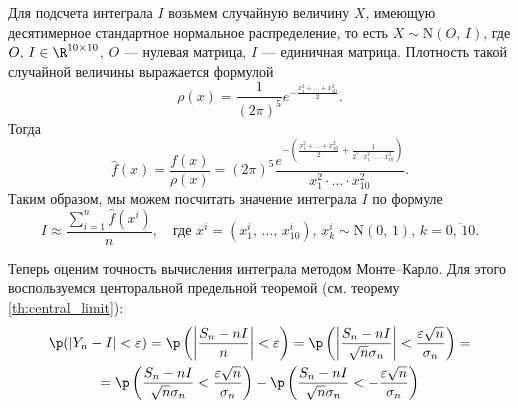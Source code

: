 Для подсчета интеграла $I$ возьмем случайную величину $X$, имеющую десятимерное стандартное нормальное распределение, то есть $X \sim \mbox{N} (O,\,I)$, где $O,\,I \in \R^{10 \times 10}$, $O$ --- нулевая матрица, $I$ --- единичная матрица. Плотность такой случайной величины выражается формулой
$$
        \rho(x)
        =
        \frac{1}{(2\pi)^5}
        e^{-\frac{x_1^2 + \ldots + x_{10}^2}{2}}.
$$
Тогда
$$
\boxed{
        \hat f(x) = \frac{f(x)}{\rho(x)}
        =
        (2\pi)^5
        \frac
        {
                e^{-\left(\frac{x_1^2 + \ldots + x_{10}^2}{2} + \frac{1}{2^7 \cdot x_1^2 \cdot \ldots \cdot x_{10}^2}\right)}
        }
        {x_1^2 \cdot \ldots \cdot x_{10}^2}.
}
$$
Таким образом, мы можем посчитать значение интеграла $I$ по формуле
$$
\boxed{
        I
        \approx
        \frac
        {\sum_{i=1}^{n} \hat f(x^i)}
        {n},
        \quad
        \mbox{где $x^i = (x_1^i,\,\ldots,\,x_{10}^i)$, $x_k^i\sim\mbox{N}(0,\,1)$, $k = \overline{0,\,10}$.}
}
$$

Теперь оценим точность вычисления интеграла методом Монте--Карло. Для этого воспользуемся центоральной предельной теоремой (см. теорему \ref{th:central_limit}):
\begin{multline*}
        \p(|Y_n - I| < \varepsilon)
        =
        \p\left( \left| \frac{S_n - nI}{n} \right| < \varepsilon \right)
        =
        \p\left( \left| \frac{S_n - nI}{\sqrt{n}\sigma_n} \right| < \frac{\varepsilon\sqrt{n}}{\sigma_n} \right)
        =\\=
        \p\left( \frac{S_n - nI}{\sqrt{n}\sigma_n}  < \frac{\varepsilon\sqrt{n}}{\sigma_n} \right)
        -
        \p\left( \frac{S_n - nI}{\sqrt{n}\sigma_n}  < -\frac{\varepsilon\sqrt{n}}{\sigma_n} \right)
        \\
\end{multline*}
